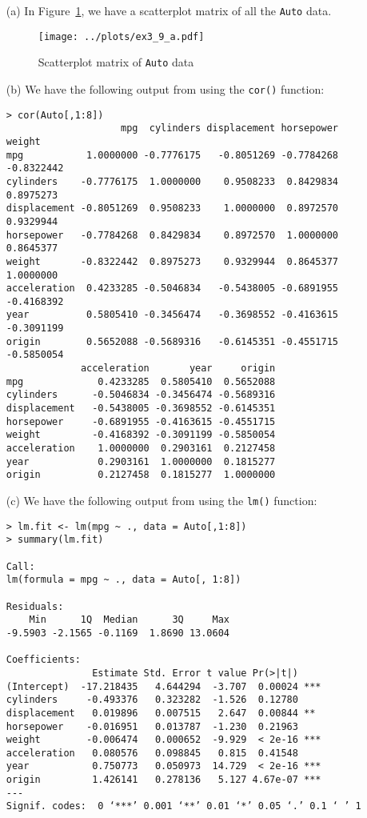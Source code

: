 
\begin{itemize}
    \item[(a)] In Figure~\ref{fig11}, we have a scatterplot matrix of all the 
        \verb|Auto| data.
        \begin{figure}[!ht]
            \texttt{[image: ../plots/ex3\_9\_a.pdf]}
            \caption{Scatterplot matrix of \texttt{Auto} data \label{fig11}}
        \end{figure}
    \item[(b)] We have the following output from using the \verb|cor()| function:
        \scriptsize\begin{verbatim}
> cor(Auto[,1:8])
                    mpg  cylinders displacement horsepower     weight
mpg           1.0000000 -0.7776175   -0.8051269 -0.7784268 -0.8322442
cylinders    -0.7776175  1.0000000    0.9508233  0.8429834  0.8975273
displacement -0.8051269  0.9508233    1.0000000  0.8972570  0.9329944
horsepower   -0.7784268  0.8429834    0.8972570  1.0000000  0.8645377
weight       -0.8322442  0.8975273    0.9329944  0.8645377  1.0000000
acceleration  0.4233285 -0.5046834   -0.5438005 -0.6891955 -0.4168392
year          0.5805410 -0.3456474   -0.3698552 -0.4163615 -0.3091199
origin        0.5652088 -0.5689316   -0.6145351 -0.4551715 -0.5850054
             acceleration       year     origin
mpg             0.4233285  0.5805410  0.5652088
cylinders      -0.5046834 -0.3456474 -0.5689316
displacement   -0.5438005 -0.3698552 -0.6145351
horsepower     -0.6891955 -0.4163615 -0.4551715
weight         -0.4168392 -0.3091199 -0.5850054
acceleration    1.0000000  0.2903161  0.2127458
year            0.2903161  1.0000000  0.1815277
origin          0.2127458  0.1815277  1.0000000
        \end{verbatim}\normalsize
    \item[(c)] We have the following output from using the \verb|lm()| function:
        \small\begin{verbatim}
> lm.fit <- lm(mpg ~ ., data = Auto[,1:8])
> summary(lm.fit)

Call:
lm(formula = mpg ~ ., data = Auto[, 1:8])

Residuals:
    Min      1Q  Median      3Q     Max 
-9.5903 -2.1565 -0.1169  1.8690 13.0604 

Coefficients:
               Estimate Std. Error t value Pr(>|t|)    
(Intercept)  -17.218435   4.644294  -3.707  0.00024 ***
cylinders     -0.493376   0.323282  -1.526  0.12780    
displacement   0.019896   0.007515   2.647  0.00844 ** 
horsepower    -0.016951   0.013787  -1.230  0.21963    
weight        -0.006474   0.000652  -9.929  < 2e-16 ***
acceleration   0.080576   0.098845   0.815  0.41548    
year           0.750773   0.050973  14.729  < 2e-16 ***
origin         1.426141   0.278136   5.127 4.67e-07 ***
---
Signif. codes:  0 ‘***’ 0.001 ‘**’ 0.01 ‘*’ 0.05 ‘.’ 0.1 ‘ ’ 1


\end{verbatim}
\end{itemize}
